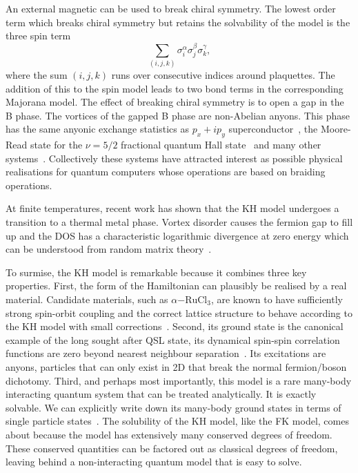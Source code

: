 An external magnetic can be used to break chiral symmetry. The lowest order term which breaks chiral symmetry but retains the solvability of the model is the three spin term \[
\sum_{(i,j,k)} \sigma_i^{\alpha} \sigma_j^{\beta} \sigma_k^{\gamma},
\] where the sum \((i,j,k)\) runs over consecutive indices around plaquettes. The addition of this to the spin model leads to two bond terms in the corresponding Majorana model. The effect of breaking chiral symmetry is to open a gap in the B phase. The vortices of the gapped B phase are non-Abelian anyons. This phase has the same anyonic exchange statistics as \(p_x + ip_y\) superconductor~\autocite{readPairedStatesFermions2000}, the Moore-Read state for the \(\nu = 5/2\) fractional quantum Hall state~\autocite{mooreNonabelionsFractionalQuantum1991} and many other systems~\autocite{aliceaNonAbelianStatisticsTopological2011,fuSuperconductingProximityEffect2008,lutchynMajoranaFermionsTopological2010,oregHelicalLiquidsMajorana2010,sauGenericNewPlatform2010}. Collectively these systems have attracted interest as possible physical realisations for quantum computers whose operations are based on braiding operations.

At finite temperatures, recent work has shown that the KH model undergoes a transition to a thermal metal phase. Vortex disorder causes the fermion gap to fill up and the DOS has a characteristic logarithmic divergence at zero energy which can be understood from random matrix theory~\autocite{selfThermallyInducedMetallic2019}.

To surmise, the KH model is remarkable because it combines three key properties. First, the form of the Hamiltonian can plausibly be realised by a real material. Candidate materials, such as \(\alpha\mathrm{-RuCl}_3\), are known to have sufficiently strong spin-orbit coupling and the correct lattice structure to behave according to the KH model with small corrections~\autocite{banerjeeProximateKitaevQuantum2016,TrebstPhysRep2022}. Second, its ground state is the canonical example of the long sought after QSL state, its dynamical spin-spin correlation functions are zero beyond nearest neighbour separation~\autocite{baskaranExactResultsSpin2007}. Its excitations are anyons, particles that can only exist in 2D that break the normal fermion/boson dichotomy. Third, and perhaps most importantly, this model is a rare many-body interacting quantum system that can be treated analytically. It is exactly solvable. We can explicitly write down its many-body ground states in terms of single particle states~\autocite{kitaevAnyonsExactlySolved2006}. The solubility of the KH model, like the FK model, comes about because the model has extensively many conserved degrees of freedom. These conserved quantities can be factored out as classical degrees of freedom, leaving behind a non-interacting quantum model that is easy to solve.
